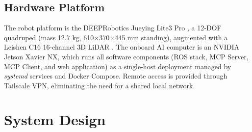\documentclass[conference]{IEEEtran}
\begin{document}
\begin{table}[htbp]
\caption{Communication Protocols Between System Components}
\label{tab:protocols}
\centering
{}
\end{table}

\subsection{Hardware Platform}
The robot platform is the DEEPRobotics Jueying Lite3 Pro \cite{DEEPRoboticsLite3Pro2024}, a 12-DOF quadruped (mass 12.7 kg, 610$\times$370$\times$445 mm standing), augmented with a Leishen C16 16-channel 3D LiDAR \cite{DEEPRoboticsLite3LiDAR2025}. The onboard AI computer is an NVIDIA Jetson Xavier NX, which runs all software components (ROS stack, MCP Server, MCP Client, and web application) as a single-host deployment managed by \textit{systemd} services and Docker Compose. Remote access is provided through Tailscale VPN, eliminating the need for a shared local network.

\section{System Design}
\end{document}
